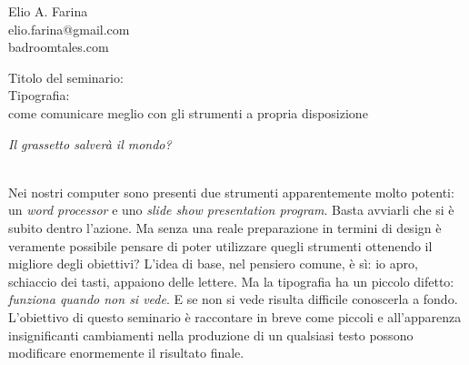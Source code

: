 \documentclass{article}
\begin{document}
\clearpage
\null\hfill\begin{minipage}{0.4\linewidth}\raggedleft
{}\\
\fontsize{10pt}{12pt}\selectfont
elio.farina@gmail.com\\
badroomtales.com
\egroup
\end{minipage}
\large

\vspace{28pt}
Titolo del seminario:\\[7pt]
{\LARGE Tipografia:\\ come comunicare meglio con gli strumenti a propria disposizione}

\vspace{28pt}
\begin{adjustwidth}{42pt}{0pt}
\begin{center}
\textit{Il grassetto salverà il mondo?}\\[7pt]
{\huge \adfhangingflatleafleft}\\[7pt]
\end{center}

Nei nostri computer sono presenti due strumenti apparentemente molto potenti: un \textit{word processor} e uno \textit{slide show presentation program}. Basta avviarli che si è subito dentro l'azione. Ma senza una reale preparazione in termini di design è veramente possibile pensare di poter utilizzare quegli strumenti ottenendo il migliore degli obiettivi? L'idea di base, nel pensiero comune, è sì: io apro, schiaccio dei tasti, appaiono delle lettere. Ma la tipografia ha un piccolo difetto: \emph{funziona \emph{quando} non \emph{si vede}}. E se non si vede risulta difficile conoscerla a fondo. L'obiettivo di questo seminario è raccontare in breve come piccoli e all'apparenza insignificanti cambiamenti nella produzione di un qualsiasi testo possono modificare enormemente il risultato finale.

\end{adjustwidth}
\end{document}
